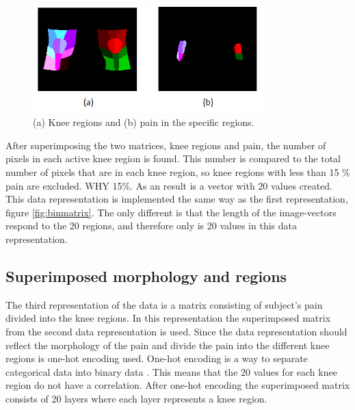 \begin{figure} [H]
\centering
\includegraphics[width=0.8\textwidth]{figures/binregions}
\caption{(a) Knee regions and (b) pain in the specific regions.}
\label{fig:binregions}
\end{figure}

\noindent
After superimposing the two matrices, knee regions and pain, the number of pixels in each active knee region is found. This number is compared to the total number of pixels that are in each knee region, so knee regions with less than 15 \% pain are excluded. WHY 15\%. As an result is a vector with 20 values created. This data representation is implemented the same way as the first representation, figure \ref{fig:binmatrix}. The only different is that the length of the image-vectors respond to the 20 regions, and therefore only is 20 values in this data representation. 


\subsection{Superimposed morphology and regions}
The third representation of the data is a matrix consisting of subject's pain divided into the knee regions.
\noindent
In this representation the superimposed matrix from the second data representation is used. Since the data representation should reflect the morphology of the pain and divide the pain into the different knee regions is one-hot encoding used. One-hot encoding is a way to separate categorical data into binary data \citep{Harris2012}. This means that the 20 values for each knee region do not have a correlation. After one-hot encoding the superimposed matrix consists of 20 layers where each layer represents a knee region.

